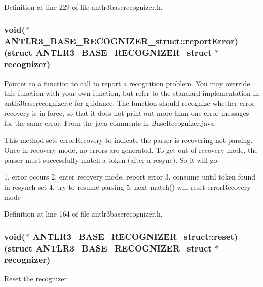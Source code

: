 Definition at line 229 of file antlr3baserecognizer.\-h.

\hypertarget{struct_a_n_t_l_r3___b_a_s_e___r_e_c_o_g_n_i_z_e_r__struct_aff75da1adc039c409ea9092e2c03b10c}{
\subsubsection[{report\-Error}]{\setlength{\rightskip}{0pt plus 5cm}void($\ast$ A\-N\-T\-L\-R3\-\_\-\-B\-A\-S\-E\-\_\-\-R\-E\-C\-O\-G\-N\-I\-Z\-E\-R\-\_\-struct\-::report\-Error)(struct {\bf A\-N\-T\-L\-R3\-\_\-\-B\-A\-S\-E\-\_\-\-R\-E\-C\-O\-G\-N\-I\-Z\-E\-R\-\_\-struct} $\ast${\bf recognizer})}}\label{struct_a_n_t_l_r3___b_a_s_e___r_e_c_o_g_n_i_z_e_r__struct_aff75da1adc039c409ea9092e2c03b10c}
Pointer to a function to call to report a recognition problem. You may override this function with your own function, but refer to the standard implementation in antlr3baserecognizer.\-c for guidance. The function should recognize whether error recovery is in force, so that it does not print out more than one error messages for the same error. From the java comments in Base\-Recognizer.\-java\-:

This method sets error\-Recovery to indicate the parser is recovering not parsing. Once in recovery mode, no errors are generated. To get out of recovery mode, the parser must successfully match a token (after a resync). So it will go\-: \begin{DoxyVerb}    1. error occurs
    2. enter recovery mode, report error
    3. consume until token found in resynch set
    4. try to resume parsing
    5. next match() will reset errorRecovery mode\end{DoxyVerb}
 

Definition at line 164 of file antlr3baserecognizer.\-h.

\hypertarget{struct_a_n_t_l_r3___b_a_s_e___r_e_c_o_g_n_i_z_e_r__struct_a428a26749476f09ec1fa2eb143e421e6}{
\subsubsection[{reset}]{\setlength{\rightskip}{0pt plus 5cm}void($\ast$ A\-N\-T\-L\-R3\-\_\-\-B\-A\-S\-E\-\_\-\-R\-E\-C\-O\-G\-N\-I\-Z\-E\-R\-\_\-struct\-::reset)(struct {\bf A\-N\-T\-L\-R3\-\_\-\-B\-A\-S\-E\-\_\-\-R\-E\-C\-O\-G\-N\-I\-Z\-E\-R\-\_\-struct} $\ast${\bf recognizer})}}\label{struct_a_n_t_l_r3___b_a_s_e___r_e_c_o_g_n_i_z_e_r__struct_a428a26749476f09ec1fa2eb143e421e6}
Reset the recognizer 

